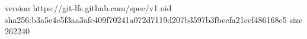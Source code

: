 version https://git-lfs.github.com/spec/v1
oid sha256:b3a5e4e5f3aa3afc409f70241a072d7119d207b3597b3fbcefa21cef486168c5
size 262240
